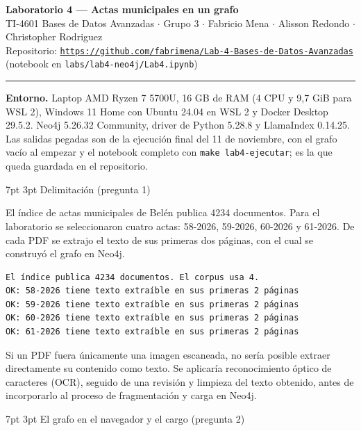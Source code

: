 \documentclass[10pt,letterpaper]{article}
\makeatletter
\renewcommand\section{\@startsection{section}{1}{\z@}%
  {7pt \@plus 2pt \@minus 1pt}{3pt}%
  {\normalfont\normalsize\bfseries\color{acc}}}
\makeatother
\begin{document}
{\LARGE\bfseries\color{acc} Laboratorio 4 --- Actas municipales en un grafo}\\[2pt]
{\footnotesize\color{gris} TI-4601 Bases de Datos Avanzadas $\cdot$ Grupo 3 $\cdot$ Fabricio Mena $\cdot$ Alisson Redondo $\cdot$ Christopher Rodriguez}\\
{\footnotesize\color{gris} Repositorio: \href{https://github.com/fabrimena/Lab-4-Bases-de-Datos-Avanzadas}{\texttt{https://github.com/fabrimena/Lab-4-Bases-de-Datos-Avanzadas}} (notebook en \texttt{labs/lab4-neo4j/Lab4.ipynb})}

\vspace{4pt}\hrule\vspace{6pt}

\textbf{Entorno.} Laptop AMD Ryzen 7 5700U, 16 GB de RAM (4 CPU y 9,7 GiB para WSL 2), Windows 11 Home con
Ubuntu 24.04 en WSL 2 y Docker Desktop 29.5.2. Neo4j 5.26.32 Community, driver de Python 5.28.8 y
LlamaIndex 0.14.25. Las salidas pegadas son de la ejecución final del 11 de noviembre, con el grafo vacío al
empezar y el notebook completo con \texttt{make lab4-ejecutar}; es la que queda guardada en el repositorio.

\section{Delimitación (pregunta 1)}


El índice de actas municipales de Belén publica 4234 documentos.
Para el laboratorio se seleccionaron cuatro actas:
58-2026, 59-2026, 60-2026 y 61-2026.
De cada PDF se extrajo el texto de sus primeras dos páginas,
con el cual se construyó el grafo en Neo4j.

\begin{Verbatim}
El índice publica 4234 documentos. El corpus usa 4.
OK: 58-2026 tiene texto extraíble en sus primeras 2 páginas
OK: 59-2026 tiene texto extraíble en sus primeras 2 páginas
OK: 60-2026 tiene texto extraíble en sus primeras 2 páginas
OK: 61-2026 tiene texto extraíble en sus primeras 2 páginas
\end{Verbatim}

Si un PDF fuera únicamente una imagen escaneada, no sería
posible extraer directamente su contenido como texto.
Se aplicaría reconocimiento óptico de caracteres (OCR),
seguido de una revisión y limpieza del texto obtenido,
antes de incorporarlo al proceso de fragmentación y
carga en Neo4j.

\section{El grafo en el navegador y el cargo (pregunta 2)}
\end{document}
